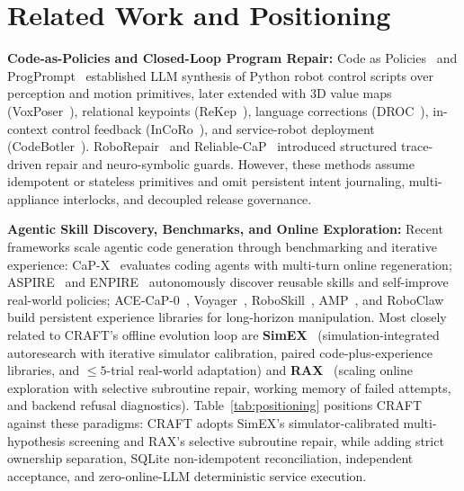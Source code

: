 \documentclass[10pt,journal]{IEEEtran}
\begin{document}
\section{Related Work and Positioning}
\label{sec:related}

\textbf{Code-as-Policies and Closed-Loop Program Repair:} Code as Policies~\cite{liang2022cap} and ProgPrompt~\cite{singh2022progprompt} established LLM synthesis of Python robot control scripts over perception and motion primitives, later extended with 3D value maps (VoxPoser~\cite{huang2023voxposer}), relational keypoints (ReKep~\cite{huang2024rekep}), language corrections (DROC~\cite{zha2023droc}), in-context control feedback (InCoRo~\cite{zhu2024incoro}), and service-robot deployment (CodeBotler~\cite{hu2023codebotler}). RoboRepair~\cite{schlesinger2024roborepair} and Reliable-CaP~\cite{ahn2025reliablecap} introduced structured trace-driven repair and neuro-symbolic guards. However, these methods assume idempotent or stateless primitives and omit persistent intent journaling, multi-appliance interlocks, and decoupled release governance.

\textbf{Agentic Skill Discovery, Benchmarks, and Online Exploration:} Recent frameworks scale agentic code generation through benchmarking and iterative experience: CaP-X~\cite{fu2026capx} evaluates coding agents with multi-turn online regeneration; ASPIRE~\cite{lu2026aspire} and ENPIRE~\cite{enpire2026} autonomously discover reusable skills and self-improve real-world policies; ACE-CaP-0~\cite{ace2026}, Voyager~\cite{wang2023voyager}, RoboSkill~\cite{xie2026roboskill}, AMP~\cite{chen2026amp}, and RoboClaw~\cite{li2026roboclaw} build persistent experience libraries for long-horizon manipulation. Most closely related to CRAFT's offline evolution loop are \textbf{SimEX}~\cite{hu2026simex} (simulation-integrated autoresearch with iterative simulator calibration, paired code-plus-experience libraries, and $\le 5$-trial real-world adaptation) and \textbf{RAX}~\cite{huang2026rax} (scaling online exploration with selective subroutine repair, working memory of failed attempts, and backend refusal diagnostics). Table~\ref{tab:positioning} positions CRAFT against these paradigms: CRAFT adopts SimEX's simulator-calibrated multi-hypothesis screening and RAX's selective subroutine repair, while adding strict ownership separation, SQLite non-idempotent reconciliation, independent acceptance, and zero-online-LLM deterministic service execution.
\end{document}
